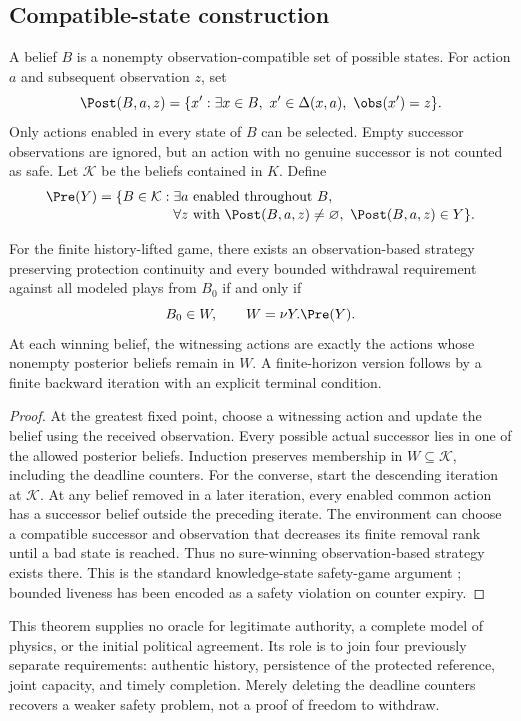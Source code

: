 \subsection{Compatible-state construction}
A belief $B$ is a nonempty observation-compatible set of possible states. For action $a$ and subsequent observation $z$, set
\begin{equation}
\Post(B,a,z)=\{x':\exists x\in B,\ x'\in\Delta(x,a),\ \obs(x')=z\}.
\end{equation}
Only actions enabled in every state of $B$ can be selected. Empty successor observations are ignored, but an action with no genuine successor is not counted as safe. Let $\mathcal K$ be the beliefs contained in $K$. Define
\begin{align}
\Pre(Y)=\{B\in\mathcal K:\;&\exists a\text{ enabled throughout }B,\\[-2pt]
&\forall z\text{ with }\Post(B,a,z)\neq\varnothing,
\ \Post(B,a,z)\in Y\}.
\end{align}

\begin{theorem}
\label{thm:kernel}
For the finite history-lifted game, there exists an observation-based strategy preserving protection continuity and every bounded withdrawal requirement against all modeled plays from $B_0$ if and only if
\begin{equation}
\label{eq:kernel}
B_0\in W,\qquad W=\nu Y.\Pre(Y).
\end{equation}
At each winning belief, the witnessing actions are exactly the actions whose nonempty posterior beliefs remain in $W$. A finite-horizon version follows by a finite backward iteration with an explicit terminal condition.
\end{theorem}
\begin{proof}
At the greatest fixed point, choose a witnessing action and update the belief using the received observation. Every possible actual successor lies in one of the allowed posterior beliefs. Induction preserves membership in $W\subseteq\mathcal K$, including the deadline counters. For the converse, start the descending iteration at $\mathcal K$. At any belief removed in a later iteration, every enabled common action has a successor belief outside the preceding iterate. The environment can choose a compatible successor and observation that decreases its finite removal rank until a bad state is reached. Thus no sure-winning observation-based strategy exists there. This is the standard knowledge-state safety-game argument \cite{chatterjee}; bounded liveness has been encoded as a safety violation on counter expiry.
\end{proof}
This theorem supplies no oracle for legitimate authority, a complete model of physics, or the initial political agreement. Its role is to join four previously separate requirements: authentic history, persistence of the protected reference, joint capacity, and timely completion. Merely deleting the deadline counters recovers a weaker safety problem, not a proof of freedom to withdraw.

